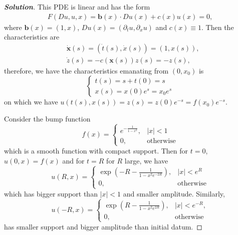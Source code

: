 \documentclass[11pt,reqno]{amsart}
\newcommand{\<}{\langle}
\newcommand{\pa}{\partial}
\renewcommand{\>}{\rangle}
\newcommand{\norm}[1]{\vert#1\vert}
\begin{document}
\begin{enumerate}[label={\arabic*.}]
\begin{proof}[\bf{Solution}]
This PDE is linear and has the form
\begin{align*}
F(Du, u , x) = \mathbf{b}(x) \cdot Du(x) + c(x) u(x) = 0,
\end{align*}
where $\mathbf{b}(x) = (1, x)$, $Du(x) = (\pa_t u, \pa_x u)$ and $c(x) \equiv 1 $. Then the characteristics are
\begin{align*}
& \dot{\mathbf{x}}(s) = (\dot{t}(s), \dot{x}(s)) = (1, x(s)),\\
& \dot{z}(s) = -c(\mathbf{x}(s))z(s) = -z(s),
\end{align*}
therefore, we have the characteristics emanating from $(0, x_0)$ is
\begin{equation*}
\begin{cases}
t(s) = s + t(0) = s\\
x(s) = x(0) e^{s} = x_0 e^s
\end{cases}
\end{equation*}
on which we have $u(t(s), x(s)) = z(s) = z(0) e^{-s} = f(x_0) e^{-s}$.


Consider the bump function 
\begin{equation*}
f (x)=
\begin{cases}
e^{-\frac{1}{1-x^2}}, & \norm{x} < 1\\
0, & \text{otherwise}
\end{cases}
\end{equation*}
which is a smooth function with compact support. Then for $t=0$, $u(0, x) = f(x)$ and for $t= R$ for $R$ large, we have 
\begin{equation*}
u(R,x)= 
\begin{cases}
\exp(-R - \frac{1}{1-x^2 e^{-2R}}), & \norm{x} < e^R\\
0, & \text{otherwise}
\end{cases}
\end{equation*}
which has bigger support than $\norm{x} < 1$ and smaller amplitude. Similarly, 
\begin{equation*}
u(-R, x) =
\begin{cases}
 \exp(R - \frac{1}{1-x^2 e^{2R}}), & \norm{x} <e^{-R}, \\
 0, & \text{otherwise}
 \end{cases}
\end{equation*}
has smaller support and bigger amplitude than initial datum.
\end{proof}






\end{enumerate}
\end{document}
